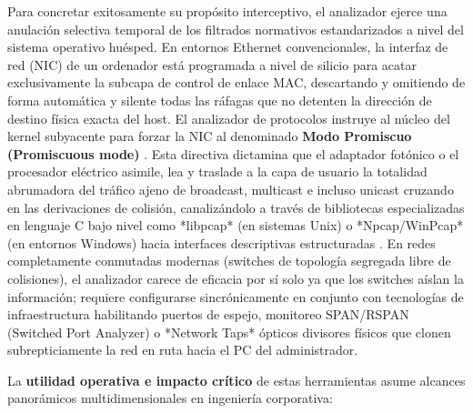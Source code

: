\documentclass[a4paper,12pt]{article}
\begin{document}
Para concretar exitosamente su propósito interceptivo, el analizador ejerce una anulación selectiva temporal de los filtrados normativos estandarizados a nivel del sistema operativo huésped. En entornos Ethernet convencionales, la interfaz de red (NIC) de un ordenador está programada a nivel de silicio para acatar exclusivamente la subcapa de control de enlace MAC, descartando y omitiendo de forma automática y silente todas las ráfagas que no detenten la dirección de destino física exacta del host. El analizador de protocolos instruye al núcleo del kernel subyacente para forzar la NIC al denominado \textbf{Modo Promiscuo (Promiscuous mode)} \cite{tanenbaum2021}. Esta directiva dictamina que el adaptador fotónico o el procesador eléctrico asimile, lea y traslade a la capa de usuario la totalidad abrumadora del tráfico ajeno de broadcast, multicast e incluso unicast cruzando en las derivaciones de colisión, canalizándolo a través de bibliotecas especializadas en lenguaje C bajo nivel como *libpcap* (en sistemas Unix) o *Npcap/WinPcap* (en entornos Windows) hacia interfaces descriptivas estructuradas \cite{stallings2014}. En redes completamente conmutadas modernas (switches de topología segregada libre de colisiones), el analizador carece de eficacia por sí solo ya que los switches aíslan la información; requiere configurarse sincrónicamente en conjunto con tecnologías de infraestructura habilitando puertos de espejo, monitoreo SPAN/RSPAN (Switched Port Analyzer) o *Network Taps* ópticos divisores físicos que clonen subrepticiamente la red en ruta hacia el PC del administrador.

La \textbf{utilidad operativa e impacto crítico} de estas herramientas asume alcances panorámicos multidimensionales en ingeniería corporativa:
\end{document}
